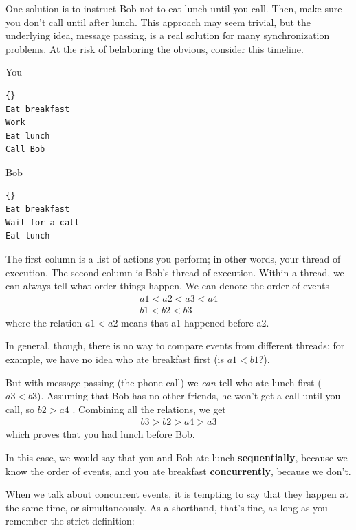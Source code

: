 \documentclass{book}
\begin{document}
One solution is to instruct Bob not to eat lunch until you call.
Then, make sure you don't call until after lunch.  This approach may
seem trivial, but the underlying idea, message passing, is a real
solution for many synchronization problems.
At the risk of belaboring the obvious, consider this timeline.

\begin{minipage}[t]{2in}
You                
\begin{lstlisting}[labelstyle=a, indent=25pt]{}
Eat breakfast 
Work          
Eat lunch     
Call Bob
\end{lstlisting}
\end{minipage}
\hfill
\begin{minipage}[t]{2in}
Bob
\begin{lstlisting}[labelstyle=b, indent=25pt]{}
Eat breakfast
Wait for a call
Eat lunch
\end{lstlisting}
\end{minipage}

The first column is a list of actions you perform; in other words,
your thread of execution.  The second column is Bob's thread of
execution.  Within a thread, we can always tell what order things
happen.  We can denote the order of events
%
\begin{eqnarray*}
a1 < a2 < a3 < a4  \\
b1 < b2 < b3
\end{eqnarray*}
%
where the relation $a1 < a2$ means that a1 happened before a2.

In general, though, there is no way to compare events from different
threads; for example, we have no idea who ate breakfast first (is $a1
< b1$?).

But with message passing (the phone call) we {\em can} tell who ate
lunch first ($a3 < b3$).  Assuming that Bob has no other friends, he
won't get a call until you call, so $b2 > a4$ .  Combining all the
relations, we get
%
\begin{eqnarray*}
b3 > b2 > a4 > a3
\end{eqnarray*}
%
which proves that you had lunch before Bob.

In this case, we would say that you and Bob ate lunch
{\bf sequentially}, because we know the order of events, and you
ate breakfast {\bf concurrently}, because we don't.

When we talk about concurrent events, it is tempting to say
that they happen at the same time, or simultaneously.  As a
shorthand, that's fine, as long as you remember the strict
definition:
\end{document}
